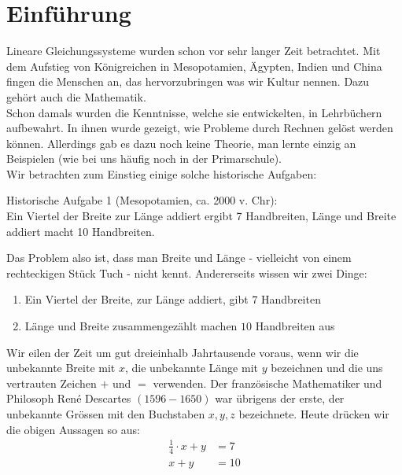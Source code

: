 \documentclass[11pt,oneside]{article}
\begin{document}
\section{Einführung}
Lineare Gleichungssysteme wurden schon vor sehr langer Zeit betrachtet. Mit dem Aufstieg von Königreichen in Mesopotamien, Ägypten, Indien und China fingen die Menschen an, das hervorzubringen was wir Kultur nennen. Dazu gehört auch die Mathematik.\\
Schon damals wurden die Kenntnisse, welche sie entwickelten, in Lehrbüchern aufbewahrt. In ihnen wurde gezeigt, wie Probleme durch Rechnen gelöst werden können. Allerdings gab es dazu noch keine Theorie, man lernte einzig an Beispielen (wie bei uns häufig noch in der Primarschule).\\
Wir betrachten zum Einstieg einige solche historische Aufgaben:
\begin{center}
	\begin{framed}
		Historische Aufgabe 1 (Mesopotamien, ca. 2000 v. Chr):\\
		\glqq Ein Viertel der Breite zur Länge addiert ergibt 7 Handbreiten, Länge und Breite addiert macht 10 Handbreiten\grqq.
	\end{framed}
\end{center}
Das Problem also ist, dass man Breite und Länge - vielleicht von einem rechteckigen Stück Tuch - nicht kennt. Andererseits wissen wir zwei Dinge:
\begin{enumerate}[label=\alph*)]
	\item Ein Viertel der Breite, zur Länge addiert, gibt $7$ Handbreiten
	\item Länge und Breite zusammengezählt machen $10$ Handbreiten aus
\end{enumerate}
Wir eilen der Zeit um gut dreieinhalb Jahrtausende voraus, wenn wir die unbekannte Breite mit $x$, die unbekannte Länge mit $y$ bezeichnen und die uns vertrauten Zeichen $+$ und $=$ verwenden. Der französische Mathematiker und Philosoph René Descartes $\left(1596-1650\right)$ war übrigens der erste, der unbekannte Grössen mit den Buchstaben $x,y,z$ bezeichnete. Heute drücken wir die obigen Aussagen so aus:
\begin{align*}
	\frac{1}{4}\cdot x + y &= 7 \\
	x + y &= 10
\end{align*}
\end{document}
